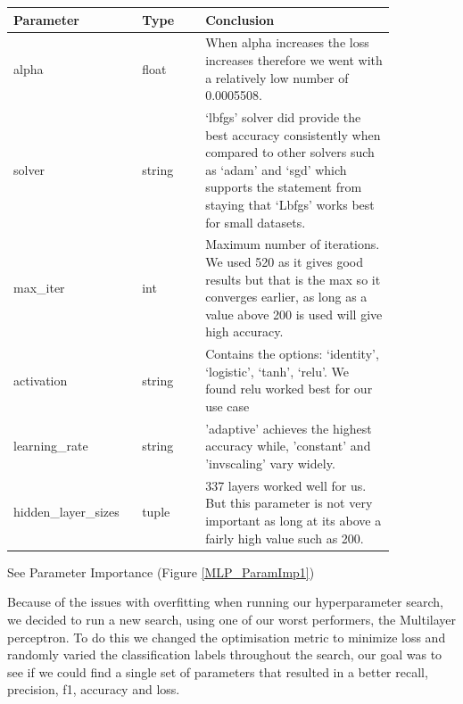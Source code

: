 \documentclass[11pt]{article}
\begin{document}
\begin{table}[ht]
  \centering
  \begin{tabular}{|p{0.25\linewidth} | p{0.15 \linewidth} | p{0.45\linewidth}|} 
    \hline
    \textbf{Parameter} & \textbf{Type} & \textbf{Conclusion} \\ \hline
    alpha & float & When alpha increases the loss increases therefore we went with a relatively low number of 0.0005508. \\ \hline 
    solver & string & ‘lbfgs’ solver did provide the best accuracy consistently when compared to other solvers such as ‘adam’ and ‘sgd’ which supports the statement from \cite{SklearnNeuralNetwork} staying that ‘Lbfgs’ works best for small datasets. \\ \hline
    max\_iter & int & Maximum number of iterations. We used 520 as it gives good results but that is the max so it converges earlier, as long as a value above 200 is used will give high accuracy. \\ \hline
    activation & string & Contains the options: ‘identity’, ‘logistic’, ‘tanh’, ‘relu’. We found relu worked best for our use case  \\ \hline  
    learning\_rate & string & 'adaptive' achieves the highest accuracy while, 'constant' and 'invscaling' vary widely. \\ \hline  
    hidden\_layer\_sizes & tuple & 337 layers worked well for us. But this parameter is not very important as long at its above a fairly high value such as 200. \\ \hline
  \end{tabular}
\end{table}\label{MLP_Analysis_Table}
\FloatBarrier
See Parameter Importance (Figure \ref{MLP_ParamImp1})

Because of the issues with overfitting when running our hyperparameter search, we decided to run a new search, using one of our worst performers, the Multilayer perceptron.
To do this we changed the optimisation metric to minimize loss and randomly varied the classification labels throughout the search, our goal was to see if we could find a single set of parameters that resulted in a better recall, precision, f1, accuracy and loss.




\newpage
\end{document}
